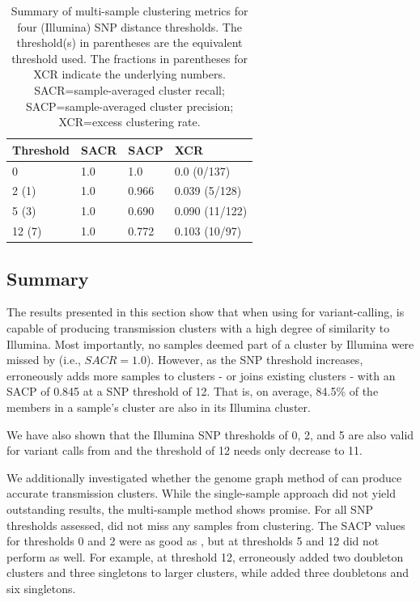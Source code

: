 \begin{table}
\centering
\begin{tabular}{@{}llll@{}}
\toprule
Threshold & SACR & SACP  & XCR            \\ \midrule
0         & 1.0  & 1.0   & 0.0 (0/137)    \\
2 (1)     & 1.0  & 0.966 & 0.039 (5/128)  \\
5 (3)     & 1.0  & 0.690 & 0.090 (11/122) \\
12 (7)    & 1.0  & 0.772 & 0.103 (10/97)  \\ \bottomrule
\end{tabular}
\caption{Summary of \pandora{} multi-sample clustering metrics for four (Illumina) SNP distance thresholds. The threshold(s) in parentheses are the \ont{} equivalent threshold used. The fractions in parentheses for XCR indicate the underlying numbers. SACR=sample-averaged cluster recall; SACP=sample-averaged cluster precision; XCR=excess clustering rate.}
\label{tab:compare-cluster-summary}
\end{table}

\subsection{Summary}
\label{sec:cluster-summary}

The results presented in this section show that when using \bcftools{} for variant-calling, \ont{} is capable of producing transmission clusters with a high degree of similarity to Illumina. Most importantly, no samples deemed part of a cluster by Illumina were missed by \bcftools{} (i.e., $SACR=1.0$). However, as the SNP threshold increases, \bcftools{} erroneously adds more samples to clusters - or joins existing clusters - with an SACP of 0.845 at a SNP threshold of 12. That is, on average, 84.5\% of the members in a sample's \ont{} cluster are also in its Illumina cluster. 

We have also shown that the Illumina SNP thresholds of 0, 2, and 5 are also valid for \ont{} variant calls from \bcftools{} and the threshold of 12 needs only decrease to 11. 

We additionally investigated whether the genome graph method of \pandora{} can produce accurate transmission clusters. While the single-sample approach did not yield outstanding results, the multi-sample method shows promise. For all SNP thresholds assessed, \compare{} did not miss any samples from clustering. The SACP values for thresholds 0 and 2 were as good as \bcftools{}, but at thresholds 5 and 12 \compare{} did not perform as well. For example, at threshold 12, \bcftools{} erroneously added two doubleton clusters and three singletons to larger clusters, while \compare{} added three doubletons and six singletons.

